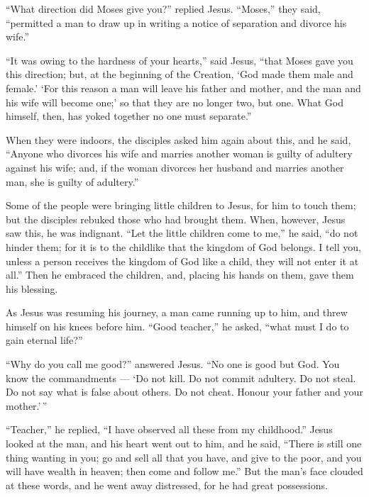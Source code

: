  ``What direction did Moses give you?'' replied Jesus.
 ``Moses,'' they said, ``permitted a man to draw up in
writing a notice of separation and divorce his wife.''

 ``It was owing to the hardness of your hearts,'' said
Jesus, ``that Moses gave you this direction;  but, at the
beginning of the Creation, `God made them male and female.' 
`For this reason a man will leave his father and mother, 
and the man and his wife will become one;' so that they are no longer
two, but one.  What God himself, then, has yoked together no
one must separate.''

 When they were indoors, the disciples asked him again
about this,  and he said, ``Anyone who divorces his wife
and marries another woman is guilty of adultery against his wife;
 and, if the woman divorces her husband and marries another
man, she is guilty of adultery.''

 Some of the people were bringing little children to Jesus,
for him to touch them; but the disciples rebuked those who had brought
them.  When, however, Jesus saw this, he was indignant.
``Let the little children come to me,'' he said, ``do not hinder them;
for it is to the childlike that the kingdom of God belongs.
 I tell you, unless a person receives the kingdom of God
like a child, they will not enter it at all.''  Then he
embraced the children, and, placing his hands on them, gave them his
blessing.

 As Jesus was resuming his journey, a man came running up
to him, and threw himself on his knees before him. ``Good teacher,'' he
asked, ``what must I do to gain eternal life?''

 ``Why do you call me good?'' answered Jesus. ``No one is
good but God.  You know the commandments --- `Do not kill.
Do not commit adultery. Do not steal. Do not say what is false about
others. Do not cheat. Honour your father and your mother.'\,''

 ``Teacher,'' he replied, ``I have observed all these from
my childhood.''  Jesus looked at the man, and his heart
went out to him, and he said, ``There is still one thing wanting in you;
go and sell all that you have, and give to the poor, and you will have
wealth in heaven; then come and follow me.''  But the man's
face clouded at these words, and he went away distressed, for he had
great possessions.

